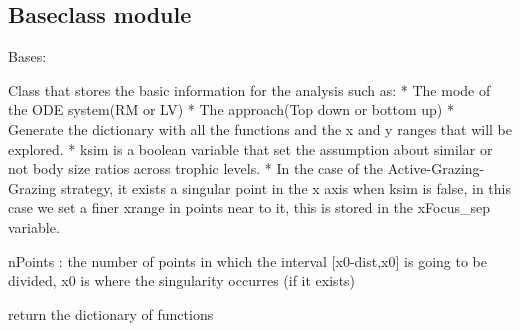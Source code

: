 \documentclass[letterpaper,10pt,english]{sphinxmanual}
\begin{document}
\subsection{Baseclass module}
\label{Analisis/Baseclass::doc}\label{Analisis/Baseclass:baseclass-module}\label{Analisis/Baseclass:module-Baseclass}

\begin{fulllineitems}
\label{Analisis/Baseclass:Baseclass.BSR}
Bases: 

Class that stores the basic information for the analysis such as:
* The mode of the ODE system(RM or LV)
* The approach(Top down or bottom up)
* Generate the dictionary with all the functions and the x and y ranges that will be explored.
* ksim is a boolean variable that set the assumption about similar or not body size ratios across trophic levels.
* In the case of the Active-Grazing-Grazing strategy, it exists a singular point in the x axis when ksim is false, in this case we set a finer xrange
in points near to it, this is stored in the xFocus\_sep variable.

\begin{fulllineitems}
\label{Analisis/Baseclass:Baseclass.BSR.getParams}
\end{fulllineitems}


\begin{fulllineitems}
\label{Analisis/Baseclass:Baseclass.BSR.getandSetxFocus}
nPoints : the number of points in which the interval {[}x0-dist,x0{]} is going to be divided, x0 is where the singularity occurres (if it exists)

\end{fulllineitems}


\begin{fulllineitems}
\label{Analisis/Baseclass:Baseclass.BSR.getfDict}
return the dictionary of functions

\end{fulllineitems}


\end{fulllineitems}
\end{document}
